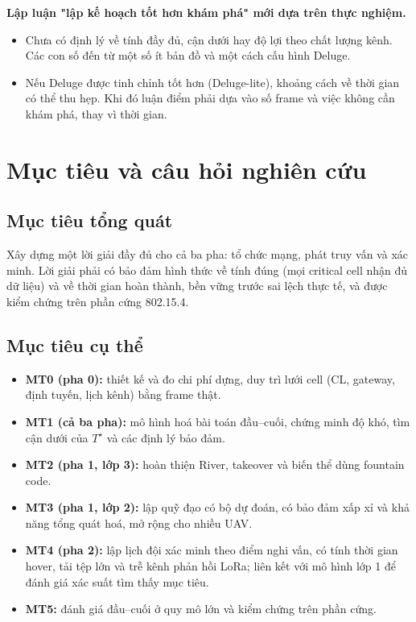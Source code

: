 \textbf{Lập luận "lập kế hoạch tốt hơn khám phá" mới dựa trên thực
nghiệm.}

\begin{itemize}
\tightlist
\item
  Chưa có định lý về tính đầy đủ, cận dưới hay độ lợi theo chất lượng
  kênh. Các con số đến từ một số ít bản đồ và một cách cấu hình Deluge.
\item
  Nếu Deluge được tinh chỉnh tốt hơn (Deluge-lite), khoảng cách về thời
  gian có thể thu hẹp. Khi đó luận điểm phải dựa vào số frame và việc
  không cần khám phá, thay vì thời gian.
\end{itemize}

\section{Mục tiêu và câu hỏi nghiên cứu}

\subsection{Mục tiêu tổng quát}

Xây dựng một lời giải đầy đủ cho cả ba pha: tổ chức mạng, phát truy vấn
và xác minh. Lời giải phải có bảo đảm hình thức về tính đúng (mọi
critical cell nhận đủ dữ liệu) và về thời gian hoàn thành, bền vững
trước sai lệch thực tế, và được kiểm chứng trên phần cứng 802.15.4.

\subsection{Mục tiêu cụ thể}

\begin{itemize}
\tightlist
\item
  \textbf{MT0 (pha 0):} thiết kế và đo chi phí dựng, duy trì lưới cell
  (CL, gateway, định tuyến, lịch kênh) bằng frame thật.
\item
  \textbf{MT1 (cả ba pha):} mô hình hoá bài toán đầu--cuối, chứng minh
  độ khó, tìm cận dưới của $T^\star$ và các định lý bảo đảm.
\item
  \textbf{MT2 (pha 1, lớp 3):} hoàn thiện River, takeover và biến thể
  dùng fountain code.
\item
  \textbf{MT3 (pha 1, lớp 2):} lập quỹ đạo có bộ dự đoán, có bảo đảm xấp
  xỉ và khả năng tổng quát hoá, mở rộng cho nhiều UAV.
\item
  \textbf{MT4 (pha 2):} lập lịch đội xác minh theo điểm nghi vấn, có
  tính thời gian hover, tải tệp lớn và trễ kênh phản hồi LoRa; liên kết
  với mô hình lớp 1 để đánh giá xác suất tìm thấy mục tiêu.
\item
  \textbf{MT5:} đánh giá đầu--cuối ở quy mô lớn và kiểm chứng trên phần
  cứng.
\end{itemize}

